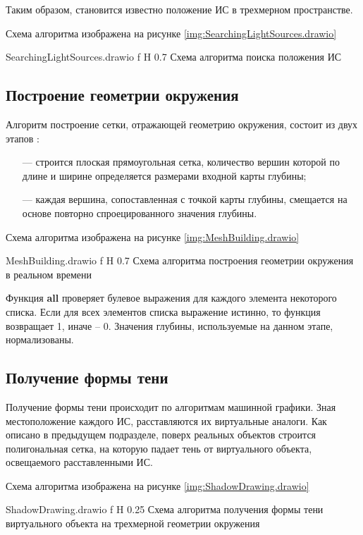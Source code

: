 Таким образом, становится известно положение ИС в трехмерном пространстве.

Схема алгоритма изображена на рисунке \ref{img:SearchingLightSources.drawio}

{SearchingLightSources.drawio}
{f}
{H}
{0.7\textwidth}
{Схема алгоритма поиска положения ИС}

\subsection{Построение геометрии окружения}

Алгоритм построение сетки, отражающей геометрию окружения, состоит из двух этапов \cite{du2020depthlab}: 

\begin{itemize}
	\item[---] строится плоская прямоугольная сетка, количество вершин которой по длине и ширине определяется размерами входной карты глубины;
	\item[---] каждая вершина, сопоставленная с точкой карты глубины, смещается на основе повторно спроецированного значения глубины.
\end{itemize}

Схема алгоритма изображена на рисунке \ref{img:MeshBuilding.drawio}

{MeshBuilding.drawio}
{f}
{H}
{0.7\textwidth}
{Схема алгоритма построения геометрии окружения в реальном времени}

Функция \textbf{all} проверяет булевое выражения для каждого элемента некоторого списка. Если для всех элементов списка выражение истинно, то функция возвращает 1, иначе -- 0. Значения глубины, используемые на данном этапе, нормализованы.

\subsection{Получение формы тени}

Получение формы тени происходит по алгоритмам машинной графики. Зная местоположение каждого ИС, расставляются их виртуальные аналоги. Как описано в предыдущем подразделе, поверх реальных объектов строится полигональная сетка, на которую падает тень от виртуального объекта, освещаемого расставленными ИС.

Схема алгоритма изображена на рисунке \ref{img:ShadowDrawing.drawio}

{ShadowDrawing.drawio}
{f}
{H}
{0.25\textwidth}
{Схема алгоритма получения формы тени виртуального объекта на трехмерной геометрии окружения}

